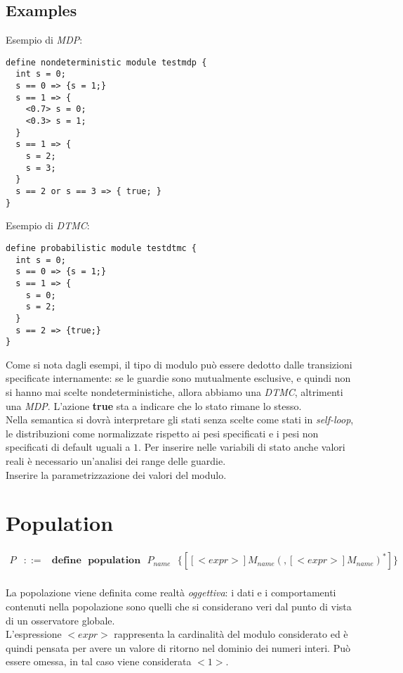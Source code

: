 \documentclass{article}
\begin{document}
\subsection{Examples}
Esempio di \emph{MDP}:
\begin{verbatim}define nondeterministic module testmdp {
  int s = 0;
  s == 0 => {s = 1;}
  s == 1 => {
    <0.7> s = 0;
    <0.3> s = 1;
  }
  s == 1 => {
    s = 2;
    s = 3;
  }
  s == 2 or s == 3 => { true; }
}
\end{verbatim}
Esempio di \emph{DTMC}:
\begin{verbatim}define probabilistic module testdtmc {
  int s = 0;
  s == 0 => {s = 1;}
  s == 1 => {
    s = 0;
    s = 2;
  }
  s == 2 => {true;}
}
\end{verbatim}
Come si nota dagli esempi, il tipo di modulo può essere dedotto dalle transizioni specificate internamente: se le guardie sono mutualmente esclusive, e quindi non si hanno mai scelte nondeterministiche, allora abbiamo una \emph{DTMC}, altrimenti una \emph{MDP}. L'azione \textbf{true} sta a indicare che lo stato rimane lo stesso. \\
Nella semantica si dovrà interpretare gli stati senza scelte come stati in \emph{self-loop}, le distribuzioni come normalizzate rispetto ai pesi specificati e i pesi non specificati di default uguali a $1$. Per inserire nelle variabili di stato anche valori reali è necessario un'analisi dei range delle guardie. \\
Inserire la parametrizzazione dei valori del modulo.

\section{Population}
$$
\begin{array}{lll}
	P &::=& \mathbf{define} \mbox{ } \mathbf{population} \mbox{ } P_{name} \mbox{ } \mathbf{\{} [[<expr>] M_{name}(\mathbf{,}[<expr>] M_{name})^*] \mathbf{\}} \\
\end{array}
$$

La popolazione viene definita come realtà \emph{oggettiva}: i dati e i comportamenti contenuti nella popolazione sono quelli che si considerano veri dal punto di vista di un osservatore globale. \\
L'espressione $<expr>$ rappresenta la cardinalità del modulo considerato ed è quindi pensata per avere un valore di ritorno nel dominio dei numeri interi. Può essere omessa, in tal caso viene considerata $<1>$.
\end{document}
